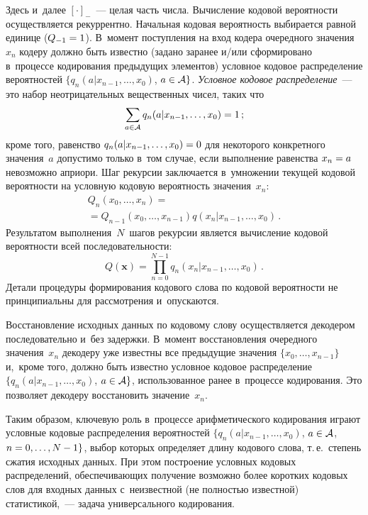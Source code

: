 \begin{multicols}{2}
\columnbreak

\noindent
Здесь и~далее $[\cdot]_{-}$~--- целая часть числа. Вычисление кодовой 
вероятности осуществляется рекуррентно. Начальная кодовая вероятность 
выбирается равной единице  ($Q_{-1}\hm=1$). 
В~момент поступления на вход кодера очередного значения~$x_n$ 
кодеру долж\-но быть известно (задано заранее и/или сфор\-мировано в~процессе 
кодирования предыдущих элементов) условное кодовое распределение 
вероятностей  $\{q_n(a|x_{n-1},\ldots,x_0)$, 
$a\hm\in{\cal A}\}$. {\it Условное кодовое распределение}~--- 
это набор неотрицательных вещественных чисел, таких что
\begin{equation}
\label{eq2}
\sum_{a\in{\cal A}}q_n(a|x_{n-1},\dots,x_0) = 1\,;
\end{equation}
кроме того, равенство $q_n(a|x_{n-1},\dots,x_0)\hm=0$ для некоторого
 конкретного значения~$a$ допустимо только в~том случае, если 
 выполнение равенства $x_n\hm=a$ невозможно априори. Шаг рекурсии заключается 
 в~умножении текущей кодовой вероятности на условную кодовую вероятность 
 значения~$x_n$:
\begin{multline*}
Q_n\left(x_0,\dots,x_n\right)={}\\
{}=Q_{n-1}\left(x_0,\dots,x_{n-1}\right)
q\left(x_n|x_{n-1},\dots,x_0\right)\,.
\end{multline*}
Результатом выполнения~$N$~шагов рекурсии является вычисление кодовой вероятности 
всей последовательности:
\begin{equation}
\label{eq3}
Q(\mathbf{x}) =\prod\limits_{n=0}^{N-1} q_n\left(x_n|x_{n-1},\dots,x_0\right)\,.
\end{equation}
Детали процедуры формирования кодового слова по кодовой вероятности не 
принципиальны для рассмотрения и~опускаются.

Восстановление исходных данных по кодовому слову осуществляется 
декодером последовательно и~без задержки. В~момент восстановления очередного 
значения~$x_n$ декодеру уже известны все предыдущие значения $\{x_0,\dots,x_{n-1}\}$ 
и,~кроме того, должно быть известно условное кодовое распределение 
$\{q_n(a|x_{n-1},\dots,x_0)$, $a\hm\in{\cal A}\}$, использованное ранее 
в~процессе кодирования. Это позволяет декодеру восстановить значение~$x_n$.

Таким образом, ключевую роль в~процессе арифметического кодирования играют 
условные кодовые распределения вероятностей $\{q_n(a|x_{n-1},\dots,x_0)$,
$a\hm\in{\cal A}$, $n\hm=0,\ldots,N-1\}$, выбор которых определяет длину 
кодового слова, т.\,е.\ степень сжатия исходных данных. При этом 
построение условных кодовых распределений, обеспечивающих получение 
возможно более коротких кодовых слов для входных данных с~неизвестной 
(не полностью известной) статистикой,~--- задача универсального кодирования.


\end{multicols}
